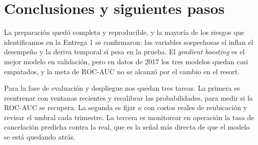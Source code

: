 \documentclass[conference]{IEEEtran}
\begin{document}
\section{Conclusiones y siguientes pasos}

La preparación quedó completa y reproducible, y la mayoría de los riesgos que identificamos en la
Entrega 1 se confirmaron: las variables sospechosas sí inflan el desempeño y la deriva temporal sí
pesa en la prueba. El \emph{gradient boosting} es el mejor modelo en validación, pero en datos de
2017 los tres modelos quedan casi empatados, y la meta de ROC-AUC no se alcanzó por el cambio en el
resort.

Para la fase de evaluación y despliegue nos quedan tres tareas. La primera es reentrenar con
ventanas recientes y recalibrar las probabilidades, para medir si la ROC-AUC se recupera. La
segunda es fijar $\kappa$ con costos reales de reubicación y revisar el umbral cada trimestre. La
tercera es monitorear en operación la tasa de cancelación predicha contra la real, que es la
señal más directa de que el modelo se está quedando atrás.
\end{document}
